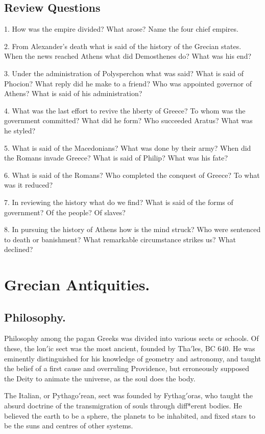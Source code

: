 \documentclass[openany,a4paper]{memoir}
\begin{document}
\section{Review Questions}

1. How was the empire divided? What arose? Name 
the four chief empires.

2. From Alexander's death what is said of the 
history of the Grecian states. When the news reached Athens what 
did Demosthenes do? What was his end? 

3. Under the administration of Polysperchon what was said? What 
is said of Phocion? What reply did he make to a friend? Who was 
appointed governor of Athens? What is said of his administration?

4. What was the last effort to revive the hberty of Greece? To whom 
was the government committed? What did he form? Who succeeded 
Aratus? What was he styled?

5. What is said of the Macedonians? 
What was done by their army? 
When did the Romans invade Greece? What is said of Philip? 
What was his fate? 

6. What is said of the Romans? Who completed 
the conquest of Greece? To what was it reduced? 

7. In reviewing 
the history what do we find? What is said of the forms of government? 
Of the people? Of slaves?

8. In pursuing the history of Athens how 
is the mind struck? 
Who were sentenced to death or banishment? What remarkable circumstance strikes us? What declined? 


\chapter{Grecian Antiquities.}


\section{Philosophy.}

Philosophy among the pagan Greeks 
was divided into various sects or schools. Of these, the 
lon$'$ic sect was the most ancient, founded by Tha$'$les, BC 
640. He was eminently distinguished for his knowledge of 
geometry and astronomy, and taught the belief of a first 
cause and overruling Providence, but erroneously supposed 
the Deity to animate the universe, as the soul does the body. 

The Italian, or Pythago$'$rean, sect was founded by Fythag$'$oras, who taught the absurd doctrine of the transmigration 
of souls through diff*erent bodies. He believed the earth to be 
a sphere, the planets to be inhabited, and fixed stars to be 
the suns and centres of other systems. 
\end{document}
